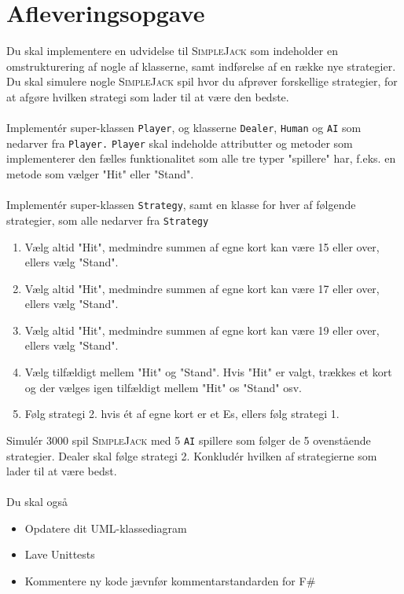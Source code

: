 \documentclass[12pt]{article}
\newcommand{\sbl}{\textsc{SimpleJack }}
\begin{document}
\section*{Afleveringsopgave}
Du skal implementere en udvidelse til \sbl som indeholder en omstrukturering af nogle af klasserne, samt indførelse
af en række nye strategier. Du skal simulere nogle \sbl spil hvor du afprøver forskellige strategier, for at afgøre
hvilken strategi som lader til at være den bedste. \\ \\
Implementér super-klassen \texttt{Player}, og klasserne \texttt{Dealer}, \texttt{Human} og \texttt{AI} som nedarver
fra \texttt{Player.} \texttt{Player} skal indeholde attributter og metoder som implementerer den fælles funktionalitet
som alle tre typer "spillere" har, f.eks. en metode som vælger "Hit" eller "Stand". \\ \\
Implementér super-klassen \texttt{Strategy}, samt en klasse for hver af følgende strategier, som alle nedarver fra
\texttt{Strategy}
\begin{enumerate}
\item Vælg altid "Hit", medmindre summen af egne kort kan være 15 eller over, ellers vælg "Stand".
\item Vælg altid "Hit", medmindre summen af egne kort kan være 17 eller over, ellers vælg "Stand".
\item Vælg altid "Hit", medmindre summen af egne kort kan være 19 eller over, ellers vælg "Stand".
\item Vælg tilfældigt mellem "Hit" og "Stand". Hvis "Hit" er valgt, trækkes et kort og der vælges igen tilfældigt mellem
"Hit" os "Stand" osv.
\item Følg strategi 2. hvis ét af egne kort er et Es, ellers følg strategi 1.
\end{enumerate}
Simulér 3000 spil \sbl med 5 \texttt{AI} spillere som følger de 5 ovenstående strategier.
Dealer skal følge strategi 2. 
Konkludér hvilken af strategierne som lader til at være bedst. \\ \\
Du skal også
\begin{itemize}
\item Opdatere dit UML-klassediagram
\item Lave Unittests
\item Kommentere ny kode jævnfør kommentarstandarden for F\#
\end{itemize}
\end{document}
